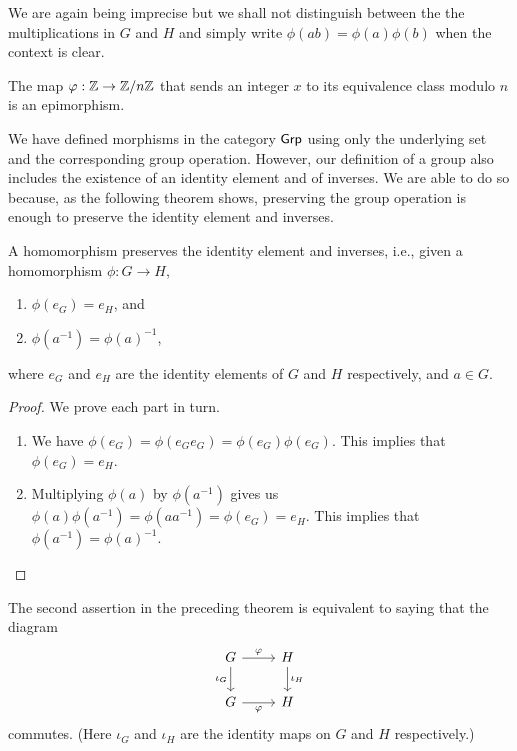 \begin{remark}
    We are again being imprecise but we shall not distinguish between the the multiplications in \(G\) and \(H\) and simply write \(\phi(ab) = \phi(a)\phi(b)\) when the context is clear.
\end{remark}

\begin{example}
    The map \(\varphi: \mathbb{Z} \to \mathbb{Z}/n\mathbb{Z}\) that sends an integer \(x\) to its equivalence class modulo \(n\) is an epimorphism.
\end{example}

\begin{sectionthm}
    We have defined morphisms in the category \(\mathsf{Grp}\) using only the underlying set and the corresponding group operation. However, our definition of a group also includes the existence of an identity element and of inverses. We are able to do so because, as the following theorem shows, preserving the group operation is enough to preserve the identity element and inverses.
\end{sectionthm}

\begin{theorem}
    A homomorphism preserves the identity element and inverses, i.e., given a homomorphism \(\phi: G \to H\),
    \begin{enumerate}[label=(\alph*)]
        \item \(\phi(e_G) = e_H\), and
        \item \(\phi(a^{-1}) = \phi(a)^{-1}\),
    \end{enumerate}
    where \(e_G\) and \(e_H\) are the identity elements of \(G\) and \(H\) respectively, and \(a \in G\).
\end{theorem}

\begin{proof}
    We prove each part in turn.

    \begin{enumerate}[label=(\alph*), wide]
        \item We have \(\phi(e_G) = \phi(e_G e_G) = \phi(e_G) \phi(e_G)\). This implies that \(\phi(e_G) = e_H\).
        \item Multiplying \(\phi(a)\) by \(\phi(a^{-1})\) gives us \(\phi(a)\phi(a^{-1}) = \phi(aa^{-1}) = \phi(e_G) = e_H\). This implies that \(\phi(a^{-1}) = \phi(a)^{-1}\).
    \end{enumerate}
\end{proof}

\begin{remark}
    The second assertion in the preceding theorem is equivalent to saying that the diagram
    \[
        \begin{tikzcd}
            G \arrow{r}{\phi} \arrow[swap]{d}{\iota_G} & H \arrow{d}{\iota_H} \\
            G \arrow[swap]{r}{\phi} & H
        \end{tikzcd}
    \]
    commutes. (Here \(\iota_G\) and \(\iota_H\) are the identity maps on \(G\) and \(H\) respectively.)
\end{remark}

